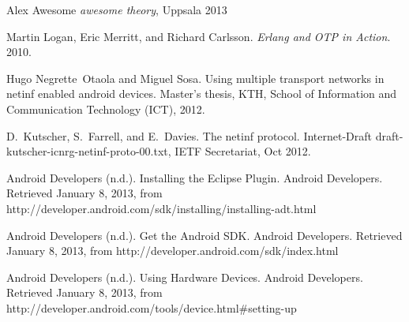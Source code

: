 \documentclass[11pt]{report}
\begin{document}
\begin{thebibliography}{99}

 Alex Awesome \textsl{awesome theory}, Uppsala 2013

 Martin Logan, Eric Merritt, and Richard Carlsson. \textsl{Erlang and OTP in Action}. 2010.

Hugo Negrette~Otaola and Miguel Sosa.
\newblock Using multiple transport networks in netinf enabled android devices.
\newblock Master's thesis, KTH, School of Information and Communication
  Technology (ICT), 2012.

D.~Kutscher, S.~Farrell, and E.~Davies.
\newblock The netinf protocol.
\newblock Internet-Draft draft-kutscher-icnrg-netinf-proto-00.txt, IETF
  Secretariat, Oct 2012.

 Android Developers (n.d.). Installing the Eclipse Plugin. Android Developers. Retrieved January 8, 2013, from http://developer.android.com/sdk/installing/installing-adt.html

 Android Developers (n.d.). Get the Android SDK. Android Developers. Retrieved January 8, 2013, from http://developer.android.com/sdk/index.html

 Android Developers (n.d.). Using Hardware Devices. Android Developers. Retrieved January 8, 2013, from http://developer.android.com/tools/device.html\#setting-up

\end{thebibliography}
\end{document}
